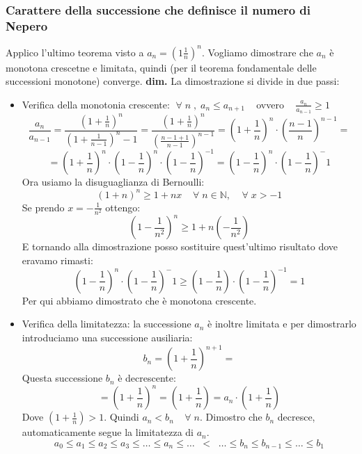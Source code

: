 \subsubsection*{Carattere della successione che definisce il numero di Nepero}
Applico l'ultimo teorema visto a $a_n = (1 \frac{1}{n})^n$.
\newline
Vogliamo dimostrare che $a_n$ è monotona crescetne e limitata, quindi (per il teorema fondamentale delle successioni monotone) converge.
\newline
\textbf{dim.} La dimostrazione si divide in due passi:
\begin{itemize}
    \item Verifica della monotonia crescente:\newline
        $\;\forall\;n \;,\; a_n \leq a_{n+1} \;\;\;$ ovvero $ \;\;\; \frac{a_n}{a_{n-1}} \geq 1$
        \[
            \frac{a_n}{a_{n-1}} = \frac{(1 + \frac{1}{n})^n}{(1 + \frac{1}{n-1})^n-1} = \frac{(1+\frac{1}{n})^n}{(\frac{n-1+1}{n-1})^{n-1}} = (1+ \frac{1}{n})^n \cdot (\frac{n-1}{n})^{n-1} = 
        \]       
        \[
            = (1+ \frac{1}{n})^n \cdot (1-\frac{1}{n})^n \cdot (1 - \frac{1}{n})^{-1} = (1- \frac{1}{n})^n \cdot (1 -\frac{1}{n})^-1
        \]
        Ora usiamo la disuguaglianza di Bernoulli:
        \[
            (1+n)^n \geq 1 + nx \;\;\; \;\forall\;n \in \mathbb{N}, \;\;\;\;\forall\;x > -1
        \]
        Se prendo $x = -\frac{1}{n^2}$ ottengo:
        \[
            (1- \frac{1}{n^2})^n \geq 1 + n(-\frac{1}{n^2})
        \]
        E tornando alla dimostrazione posso sostituire quest'ultimo risultato dove eravamo rimasti:
        \[
            (1- \frac{1}{n})^n \cdot (1 -\frac{1}{n})^-1 \geq(1-\frac{1}{n}) \cdot (1-\frac{1}{n})^{-1} = 1
        \]
        Per qui abbiamo dimostrato che è monotona crescente.
    \item Verifica della limitatezza:\newline
        la successione $a_n$ è inoltre limitata e per dimostrarlo introduciamo una successione ausiliaria:
        \[
            b_n = (1 + \frac{1}{n})^{n+1} = 
        \]
        Questa successione $b_n$ è decrescente:
        \[
            = (1 + \frac{1}{n})^{n} = (1 + \frac{1}{n}) = a_n \cdot (1 + \frac{1}{n})
        \]
        Dove $(1 + \frac{1}{n}) > 1$. \newline
        Quindi $a_n < b_n \;\;\;\;\forall\; n$.
        Dimostro che $b_n$ decresce, automaticamente segue la limitatezza di $a_n$.
        \[
            a_0\leq a_1 \leq a_2 \leq a_3 \leq \dots \leq a_n \leq \dots \;\; <  \;\; \dots \leq b_n \leq b_{n-1} \leq \dots \leq b_1
\]
\end{itemize}
